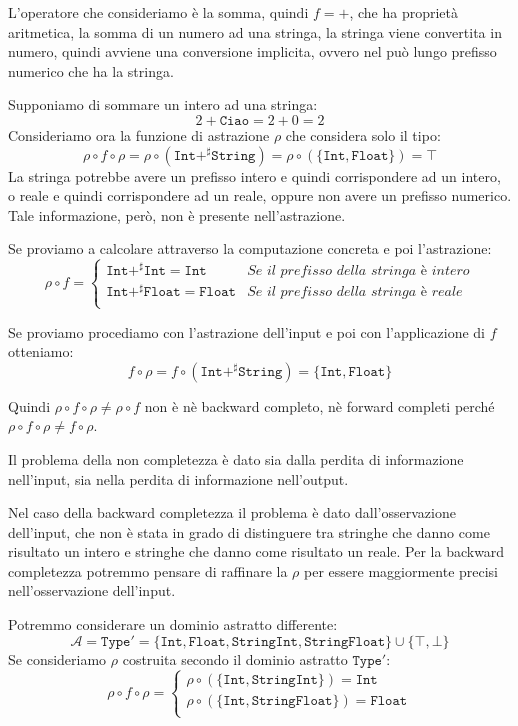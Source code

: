 L'operatore che consideriamo è la somma, quindi $f = +$, che ha proprietà aritmetica, 
la somma di un numero ad una stringa, la stringa viene convertita in numero, quindi avviene 
una conversione implicita, ovvero nel può lungo prefisso numerico che ha la stringa.

Supponiamo di sommare un intero ad una stringa:
\[
    2 + \texttt{Ciao} = 2 + 0 = 2
\]
Consideriamo ora la funzione di astrazione $\rho$ che considera solo il tipo:
\[
  \rho \circ f \circ \rho = \rho \circ (\texttt{Int} +^\sharp \texttt{String}) = 
  \rho \circ (\{ \texttt{Int}, \texttt{Float} \}) = \top
\]
La stringa potrebbe avere un prefisso intero e quindi corrispondere ad un intero, o 
reale e quindi corrispondere ad un reale, oppure non avere un prefisso numerico. 
Tale informazione, però, non è presente nell'astrazione.

Se proviamo a calcolare attraverso la computazione concreta e poi l'astrazione:
\[
    \rho \circ f = 
    \begin{cases}
        \texttt{Int} +^\sharp \texttt{Int} = \texttt{Int}  & \textit{Se il prefisso della stringa è intero}\\
        \texttt{Int} +^\sharp \texttt{Float} = \texttt{Float} & \textit{Se il prefisso della stringa è reale}\\
    \end{cases}
\]

Se proviamo procediamo con l'astrazione dell'input e poi con l'applicazione di $f$ otteniamo:
\[
    f \circ \rho = f \circ (\texttt{Int} +^\sharp \texttt{String}) = \{ \texttt{Int}, \texttt{Float} \}
\]
\begin{tcolorbox}
    Quindi $\rho \circ f \circ \rho \not = \rho \circ f $ non è nè backward completo, nè 
    forward completi perché $\rho \circ f \circ \rho \not = f \circ \rho$.
\end{tcolorbox}
Il problema della non completezza è dato sia dalla perdita di informazione nell'input, 
sia nella perdita di informazione nell'output.

Nel caso della backward completezza il problema è dato dall'osservazione dell'input, che 
non è stata in grado di distinguere tra stringhe che danno come risultato un intero e stringhe 
che danno come risultato un reale.
Per la backward completezza potremmo pensare di raffinare la $\rho$ per essere maggiormente 
precisi nell'osservazione dell'input. 

Potremmo considerare un dominio astratto differente:
\[
    \mathcal{A} = \texttt{Type}' = \{\texttt{Int}, \texttt{Float},
    \texttt{StringInt}, \texttt{StringFloat}\} \cup \{\top, \bot\}
\]
Se consideriamo $\rho$ costruita secondo il dominio astratto $\texttt{Type}'$:
\[
    \rho \circ f \circ \rho = 
    \begin{cases}
        \rho \circ (\{ \texttt{Int}, \texttt{StringInt} \}) = \texttt{Int} \\
        \rho \circ (\{ \texttt{Int}, \texttt{StringFloat} \}) = \texttt{Float} \\
    \end{cases}
\]

